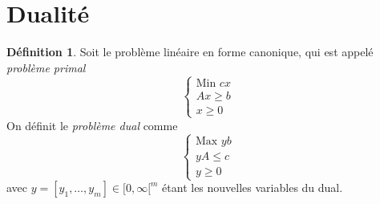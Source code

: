 \documentclass[a4paper]{report}
\theoremstyle{definition}
\newtheorem*{definition}{Définition}
\theoremstyle{remark}
\theoremstyle{plain}
\begin{document}
\section{Dualité}
\begin{definition}
Soit le problème linéaire en forme canonique, qui est appelé \emph{problème primal}
\[\begin{cases}
\text{Min } cx \\
Ax\ge b \\
x \ge 0
\end{cases}\]
On définit le \emph{problème dual} comme
\[\begin{cases}
\text{Max } yb\\
yA\le c\\
y\ge 0
\end{cases}\]
avec \(y=[y_1,\dots,y_m]\in[0,\infty[^m\)
étant les nouvelles variables du dual.
\end{definition}
\end{document}
